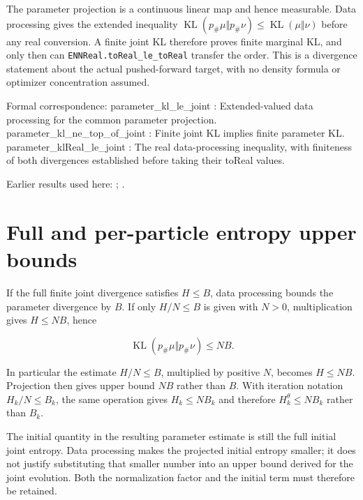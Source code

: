 \documentclass[11pt,a4paper]{article}
\begin{document}
\begin{leanbox}
The parameter projection is a continuous linear map and hence measurable. Data processing gives the extended inequality \(\operatorname{KL}(p_\#\mu\Vert p_\#\nu)\le\operatorname{KL}(\mu\Vert\nu)\) before any real conversion. A finite joint KL therefore proves finite marginal KL, and only then can \texttt{ENNReal.\allowbreak{}to\allowbreak{}Real\_\allowbreak{}le\_\allowbreak{}to\allowbreak{}Real} transfer the order. This is a divergence statement about the actual pushed-forward target, with no density formula or optimizer concentration assumed.



Formal correspondence: parameter\_kl\_le\_joint : Extended-valued data processing for the common parameter projection. parameter\_kl\_ne\_top\_of\_joint : Finite joint KL implies finite parameter KL. parameter\_klReal\_le\_joint : The real data-processing inequality, with finiteness of both divergences established before taking their toReal values.
\end{leanbox}


Earlier results used here: \cite[Section~3.1.1]{LangevinLean2026IPLA}; \cite[Section~3.1.6]{LangevinLean2026IPLA}.

\section{\texorpdfstring{Full and per-particle entropy upper bounds}{Full and per-particle entropy upper bounds}}


If the full finite joint divergence satisfies \(H\le B\), data processing bounds the parameter divergence by \(B\). If only \(H/N\le B\) is given with \(N>0\), multiplication gives \(H\le NB\), hence

\[\operatorname{KL}(p_\#\mu\Vert p_\#\nu)\le NB.\]

In particular the estimate \(H/N\le B\), multiplied by positive \(N\), becomes \(H\le NB\). Projection then gives upper bound \(NB\) rather than \(B\). With iteration notation \(H_k/N\le B_k\), the same operation gives \(H_k\le NB_k\) and therefore \(H_k^\theta\le NB_k\) rather than \(B_k\).



The initial quantity in the resulting parameter estimate is still the full initial joint entropy. Data processing makes the projected initial entropy smaller; it does not justify substituting that smaller number into an upper bound derived for the joint evolution. Both the normalization factor and the initial term must therefore be retained.
\end{document}
